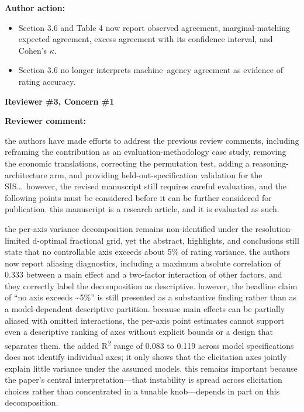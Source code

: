 \documentclass[11pt]{article}
\newcommand{\rvcomment}[1]{{\color{ReviewerGreen}#1}}
\newcommand{\concern}[1]{\textbf{\color{ReviewerGreen}#1}}
\begin{document}
\textbf{Author action:}

\begin{itemize}
\item Section 3.6 and Table 4 now report observed agreement, marginal-matching expected
agreement, excess agreement with its confidence interval, and Cohen's $\kappa$.
\item Section 3.6 no longer interprets machine--agency agreement as evidence of rating
accuracy.
\end{itemize}

\vspace{4pt}

\concern{Reviewer \#3, Concern \#1}

\concern{Reviewer comment:}

\rvcomment{the authors have made efforts to address the previous review comments, including
reframing the contribution as an evaluation-methodology case study, removing the economic
translations, correcting the permutation test, adding a reasoning-architecture arm, and providing
held-out-specification validation for the SIS\dots\ however, the revised manuscript still requires
careful evaluation, and the following points must be considered before it can be further considered
for publication. this manuscript is a research article, and it is evaluated as such.}

\rvcomment{the per-axis variance decomposition remains non-identified under the
resolution-limited d-optimal fractional grid, yet the abstract, highlights, and conclusions still
state that no controllable axis exceeds about 5\% of rating variance. the authors now report
aliasing diagnostics, including a maximum absolute correlation of 0.333 between a main effect and a
two-factor interaction of other factors, and they correctly label the decomposition as descriptive.
however, the headline claim of ``no axis exceeds \textasciitilde5\%'' is still presented as a
substantive finding rather than as a model-dependent descriptive partition. because main effects can
be partially aliased with omitted interactions, the per-axis point estimates cannot support even a
descriptive ranking of axes without explicit bounds or a design that separates them. the added
R\textsuperscript{2} range of 0.083 to 0.119 across model specifications does not identify individual
axes; it only shows that the elicitation axes jointly explain little variance under the assumed
models. this remains important because the paper's central interpretation---that instability is
spread across elicitation choices rather than concentrated in a tunable knob---depends in part on
this decomposition.}
\end{document}
